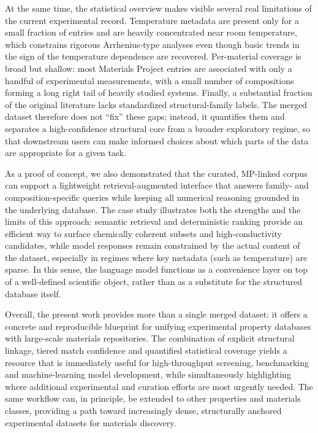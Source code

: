 \documentclass[a4paper,fleqn]{cas-sc}
\begin{document}
At the same time, the statistical overview makes visible several real limitations of the current experimental record. Temperature metadata are present only for a small fraction of entries and are heavily concentrated near room temperature, which constrains rigorous Arrhenius-type analyses even though basic trends in the sign of the temperature dependence are recovered. Per-material coverage is broad but shallow: most Materials Project entries are associated with only a handful of experimental measurements, with a small number of compositions forming a long right tail of heavily studied systems. Finally, a substantial fraction of the original literature lacks standardized structural-family labels. The merged dataset therefore does not ``fix'' these gaps; instead, it quantifies them and separates a high-confidence structural core from a broader exploratory regime, so that downstream users can make informed choices about which parts of the data are appropriate for a given task.

As a proof of concept, we also demonstrated that the curated, MP-linked corpus can support a lightweight retrieval-augmented interface that answers family- and composition-specific queries while keeping all numerical reasoning grounded in the underlying database. The case study illustrates both the strengths and the limits of this approach: semantic retrieval and deterministic ranking provide an efficient way to surface chemically coherent subsets and high-conductivity candidates, while model responses remain constrained by the actual content of the dataset, especially in regimes where key metadata (such as temperature) are sparse. In this sense, the language model functions as a convenience layer on top of a well-defined scientific object, rather than as a substitute for the structured database itself.

Overall, the present work provides more than a single merged dataset: it offers a concrete and reproducible blueprint for unifying experimental property databases with large-scale materials repositories. The combination of explicit structural linkage, tiered match confidence and quantified statistical coverage yields a resource that is immediately useful for high-throughput screening, benchmarking and machine-learning model development, while simultaneously highlighting where additional experimental and curation efforts are most urgently needed. The same workflow can, in principle, be extended to other properties and materials classes, providing a path toward increasingly dense, structurally anchored experimental datasets for materials discovery.
\end{document}
